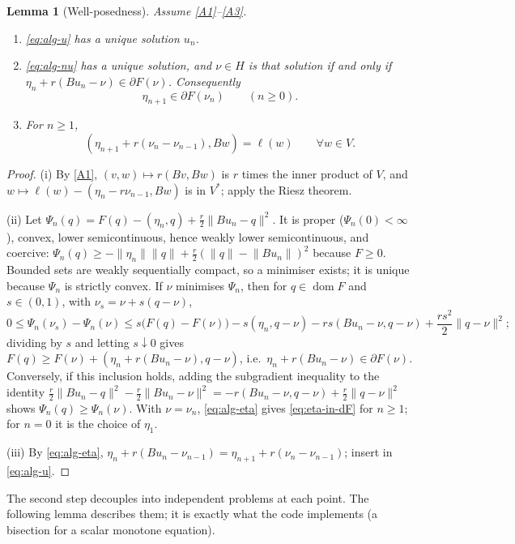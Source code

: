 \documentclass[11pt]{amsart}
\newtheorem{lemma}[theorem]{Lemma}
\theoremstyle{definition}
\theoremstyle{remark}
\numberwithin{equation}{section}
\newcommand{\norm}[1]{\lVert #1\rVert}
\DeclareMathOperator{\dom}{dom}
\begin{document}
\begin{lemma}[Well-posedness]\label{lem:wellposed}
Assume \ref{A1}--\ref{A3}.
\begin{enumerate}[label=\textup{(\roman*)}]
\item \eqref{eq:alg-u} has a unique solution $u_n$.
\item \eqref{eq:alg-nu} has a unique solution, and $\nu\in H$ is that solution if and only if $\eta_n+r(Bu_n-\nu)\in\partial F(\nu)$. Consequently
\begin{equation}\label{eq:eta-in-dF}
\eta_{n+1}\in\partial F(\nu_n)\qquad(n\ge0).
\end{equation}
\item For $n\ge1$,
\begin{equation}\label{eq:alg-u2}
(\eta_{n+1}+r(\nu_n-\nu_{n-1}),Bw)=\ell(w)\qquad\forall w\in V .
\end{equation}
\end{enumerate}
\end{lemma}
\begin{proof}
(i) By \ref{A1}, $(v,w)\mapsto r(Bv,Bw)$ is $r$ times the inner product of $V$, and $w\mapsto\ell(w)-(\eta_n-r\nu_{n-1},Bw)$ is in $V^*$; apply the Riesz theorem.

(ii) Let $\Psi_n(q)=F(q)-(\eta_n,q)+\frac r2\norm{Bu_n-q}^2$. It is proper ($\Psi_n(0)<\infty$), convex, lower semicontinuous, hence weakly lower semicontinuous, and coercive: $\Psi_n(q)\ge-\norm{\eta_n}\norm q+\frac r2(\norm q-\norm{Bu_n})^2$ because $F\ge0$. Bounded sets are weakly sequentially compact, so a minimiser exists; it is unique because $\Psi_n$ is strictly convex. If $\nu$ minimises $\Psi_n$, then for $q\in\dom F$ and $s\in(0,1)$, with $\nu_s=\nu+s(q-\nu)$,
\[
0\le\Psi_n(\nu_s)-\Psi_n(\nu)\le s\big(F(q)-F(\nu)\big)-s(\eta_n,q-\nu)-rs(Bu_n-\nu,q-\nu)+\frac{rs^2}2\norm{q-\nu}^2 ;
\]
dividing by $s$ and letting $s\downarrow0$ gives $F(q)\ge F(\nu)+(\eta_n+r(Bu_n-\nu),q-\nu)$, i.e.\ $\eta_n+r(Bu_n-\nu)\in\partial F(\nu)$. Conversely, if this inclusion holds, adding the subgradient inequality to the identity $\frac r2\norm{Bu_n-q}^2-\frac r2\norm{Bu_n-\nu}^2=-r(Bu_n-\nu,q-\nu)+\frac r2\norm{q-\nu}^2$ shows $\Psi_n(q)\ge\Psi_n(\nu)$. With $\nu=\nu_n$, \eqref{eq:alg-eta} gives \eqref{eq:eta-in-dF} for $n\ge1$; for $n=0$ it is the choice of $\eta_1$.

(iii) By \eqref{eq:alg-eta}, $\eta_n+r(Bu_n-\nu_{n-1})=\eta_{n+1}+r(\nu_n-\nu_{n-1})$; insert in \eqref{eq:alg-u}.
\end{proof}

The second step decouples into independent problems at each point. The following lemma describes them; it is exactly what the code implements (a bisection for a scalar monotone equation).
\end{document}
